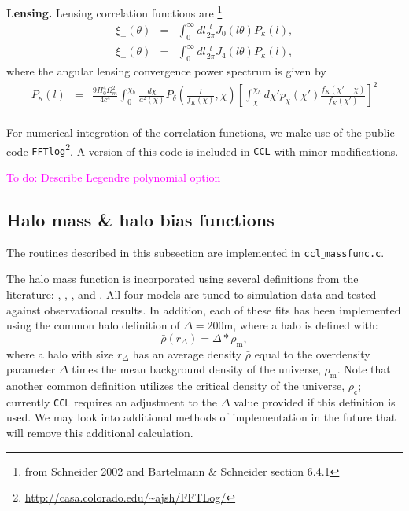 \documentclass[\docopts]{\docclass}
\newcommand{\todo}[1]{\textcolor{magenta}{To do: #1}}
\begin{document}
{\bf Lensing.} Lensing correlation functions are \footnote{from Schneider 2002 and Bartelmann \& Schneider section 6.4.1}
%
\begin{eqnarray}
\xi_{+}(\theta)&=&\int_0^{\infty}dl\frac{l}{2\pi}J_0(l\theta)P_\kappa(l),\\
\xi_{-}(\theta)&=&\int_0^{\infty}dl\frac{l}{2\pi}J_4(l\theta)P_\kappa(l),
\end{eqnarray}
%
where the angular lensing convergence power spectrum is given by
\begin{eqnarray}
P_\kappa(l) &=& \frac{9H_0^4\Omega_m^2}{4c^4}\int_{0}^{\chi_h}\frac{d\chi}{a^2(\chi)}P_\delta\left(\frac{l}{f_K(\chi)},\chi\right)\left[\int_\chi^{\chi_h}d\chi'p_\chi(\chi')\frac{f_K(\chi'-\chi)}{f_K(\chi')}\right]^2\\
\end{eqnarray}

For numerical integration of the correlation functions, we make use of the public code {\tt FFTlog}\footnote{\url{http://casa.colorado.edu/~ajsh/FFTLog/}}. A version of this code is included in {\tt CCL} with minor modifications.

\todo{Describe Legendre polynomial option}

\subsection{Halo mass \& halo bias functions}
\label{sec:hmf}

The routines described in this subsection are implemented in {\tt ccl$\_$massfunc.c}.

The halo mass function is incorporated using several definitions from the literature: \citet{Tinker2008}, \citet{Tinker2010}, \citet{Angulo2012}, and \citet{Watson2013}. All four models are tuned to simulation data and tested against observational results. In addition, each of these fits has been implemented using the common halo definition of $\Delta = 200{\mathrm{m}}$, where a halo is defined with:
\begin{equation}
\bar{\rho}(r_{\Delta}) = \Delta*\rho_{\mathrm{m}},
\end{equation}
where a halo with size $r_{\Delta}$ has an average density $\bar{\rho}$ equal to the overdensity parameter $\Delta$ times the mean background density of the universe, $\rho_{\mathrm{m}}$. Note that another common definition utilizes the critical density of the universe, $\rho_{\mathrm{c}}$; currently {\tt CCL} requires an adjustment to the $\Delta$ value provided if this definition is used. We may look into additional methods of implementation in the future that will remove this additional calculation.
\end{document}
